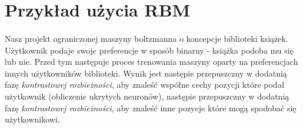 \section{Przykład użycia RBM}
    \paragraph{}
	Nasz projekt ograniczonej maszyny boltzmanna o koncepcje biblioteki książek. 
	Użytkownik podaje swoje preferencje w sposób binarny - książka podoba mu się lub nie. 
	Przed tym następuje proces trenowania maszyny oparty na preferencjach innych użytkowników biblioteki. 
	Wynik jest następie przepuszczny w dodatnią fazę \textit{kontrastowej rozbieżności},
	aby znaleść współne cechy pozycji które podał użytkownik (obliczenie ukrytych neuronów),
	następie przepuszczny w dodatnią fazę \textit{kontrastowej rozbieżności}, 
	aby znaleść inne pozycje które mogą spodobać się użytkownikowi.